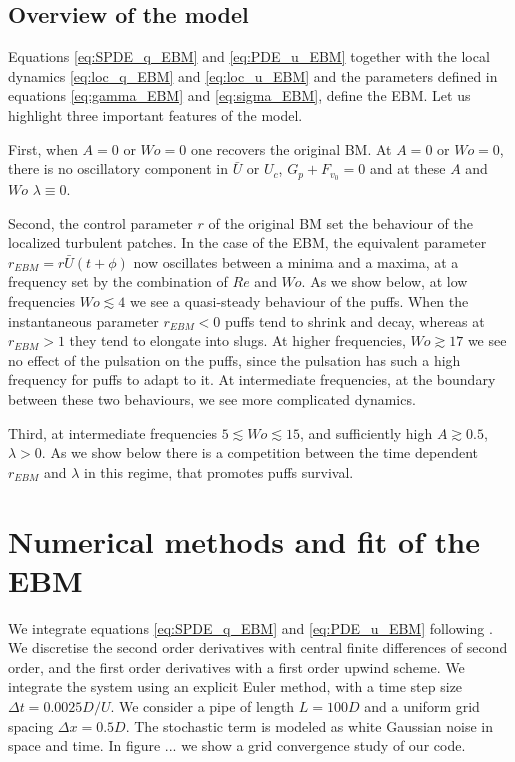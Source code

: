 \documentclass{article}
\begin{document}
\subsection{Overview of the model}
Equations \ref{eq:SPDE_q_EBM} and \ref{eq:PDE_u_EBM} together with the local dynamics \ref{eq:loc_q_EBM} and \ref{eq:loc_u_EBM} and the parameters defined in equations \ref{eq:gamma_EBM} and \ref{eq:sigma_EBM}, define the EBM. Let us highlight three important features of the model.

First, when $A=0$ or $Wo=0$ one recovers the original BM. At $A=0$ or $Wo=0$, there is no oscillatory component in $\bar{U}$ or $U_{c}$, $G_{p}+F_{v_{0}}=0$ and at these $A$ and $Wo$ $\lambda \equiv 0$. 

Second, the control parameter $r$ of the original BM set the behaviour of the localized turbulent patches. In the case of the EBM, the equivalent parameter $r_{EBM}=r \bar{U} \left(t + \phi \right)$ now oscillates between a minima and a maxima, at a frequency set by the combination of $Re$ and $Wo$. As we show below, at low frequencies $Wo \lesssim 4$ we see a quasi-steady behaviour of the puffs. When the instantaneous parameter $r_{EBM} <0$ puffs tend to shrink and decay, whereas at $r_{EBM}>1$ they tend to elongate into slugs. At higher frequencies, $Wo \gtrsim 17$ we see no effect of the pulsation on the puffs, since the pulsation has such a high frequency for puffs to adapt to it. At intermediate frequencies, at the boundary between these two behaviours, we see more complicated dynamics.

Third, at intermediate frequencies $5 \lesssim Wo \lesssim 15$, and sufficiently high $A \gtrsim 0.5$, $\lambda >0$. As we show below there is a competition between the time dependent $r_{EBM}$ and $\lambda$ in this regime, that promotes puffs survival. 

\section{Numerical methods and fit of the EBM}
We integrate equations \ref{eq:SPDE_q_EBM} and \ref{eq:PDE_u_EBM} following \cite{barkley2015rise}. We discretise the second order derivatives with central finite differences of second order, and the first order derivatives with a first order upwind scheme. We integrate the system using an explicit Euler method, with a time step size $\Delta t=0.0025 D/U$. We consider a pipe of length $L=100D$ and a uniform grid spacing $\Delta x=0.5D$. The stochastic term is modeled as white Gaussian noise in space and time. In figure ... we show a grid convergence study of our code. 
\end{document}
